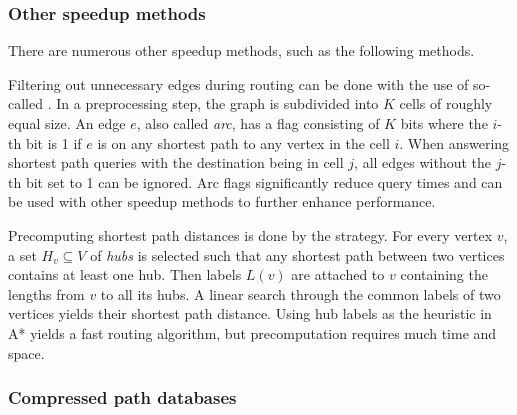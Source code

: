 		\subsubsection{Other speedup methods}
		\label{subsubsec:other-speedup-methods}
		
			There are numerous other speedup methods, such as the following methods.
			
			Filtering out unnecessary edges during routing can be done with the use of so-called \cite{bast-transportation-networks}.
			In a preprocessing step, the graph is subdivided into $K$ cells of roughly equal size.
			An edge $e$, also called \emph{arc}, has a flag consisting of $K$ bits where the $i$-th bit is 1 if $e$ is on any shortest path to any vertex in the cell $i$.
			When answering shortest path queries with the destination being in cell $j$, all edges without the $j$-th bit set to 1 can be ignored.
			Arc flags significantly reduce query times and can be used with other speedup methods to further enhance performance.
			
			Precomputing shortest path distances is done by the  strategy\cite{bast-transportation-networks}.
			For every vertex $v$, a set $H_v \subseteq V$ of \emph{hubs} is selected such that any shortest path between two vertices contains at least one hub.
			Then labels $L(v)$ are attached to $v$ containing the lengths from $v$ to all its hubs.
			A linear search through the common labels of two vertices yields their shortest path distance.
			Using hub labels as the heuristic in A* yields a fast routing algorithm, but precomputation requires much time and space.
		
		\subsubsection{Compressed path databases}
		\label{subsubsec:cpd}
		

